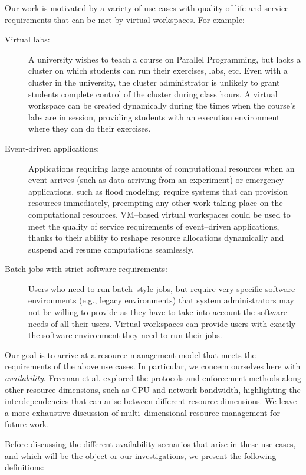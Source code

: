 Our work is motivated by a variety of use cases with quality of life and service requirements that can be met by virtual workspaces. For example:

\begin{description}
\item [Virtual labs:] A university wishes to teach a course on Parallel Programming, but lacks a cluster on which students can run their exercises, labs, etc. Even with a cluster in the university, the cluster administrator is unlikely to grant students complete control of the cluster during class hours. A virtual workspace can be created dynamically during the times when the course's labs are in session, providing students with an execution environment where they can do their exercises.
\item [Event-driven applications:] Applications requiring large amounts of computational resources when an event arrives (such as data arriving from an experiment) or emergency applications, such as flood modeling, require systems that can provision resources immediately, preempting any other work taking place on the computational resources. VM--based virtual workspaces could be used to meet the quality of service requirements of event--driven applications, thanks to their ability to reshape resource allocations dynamically and suspend and resume computations seamlessly.
\item [Batch jobs with strict software requirements:] Users who need to run batch--style jobs, but require very specific software environments (e.g., legacy environments) that system administrators may not be willing to provide as they have to take into account the software needs of all their users. Virtual workspaces can provide users with exactly the software environment they need to run their jobs.
\end{description}

Our goal is to arrive at a resource management model that meets the requirements of the above use cases. In particular, we concern ourselves here with \emph{availability}. Freeman et al. \cite{DBLP:conf/icsoc/FreemanKFRSW06} explored the protocols and enforcement methods along other resource dimensions, such as CPU and network bandwidth, highlighting the interdependencies that can arise between different resource dimensions. We leave a more exhaustive discussion of multi--dimensional resource management for future work.

Before discussing the different availability scenarios that arise in these use cases, and which will be the object or our investigations, we present the following definitions:

